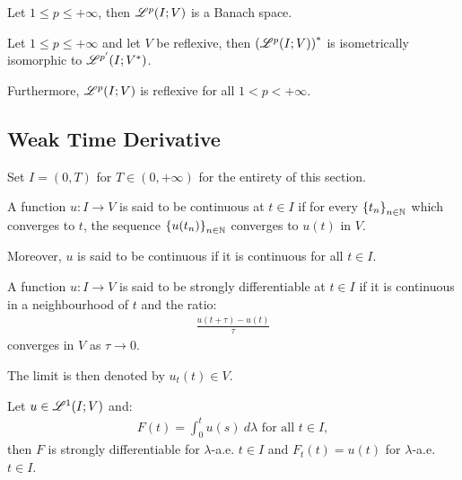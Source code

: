 \begin{theorem}
    Let $1 \leq p \leq +\infty$, then $\mathscr{L}^{p}(I; V)$ is a Banach space.
\end{theorem}

\begin{theorem} %
    Let $1 \leq p \leq +\infty$ and let $V$ be reflexive, then $\left( \mathscr{L}^{p}(I; V) \right)^*$ is isometrically isomorphic to $\mathscr{L}^{p^{\prime}}(I; V^*)$.

    Furthermore, $\mathscr{L}^{p}(I; V)$ is reflexive for all $1 < p < +\infty$.
\end{theorem}

\newpage
\subsection{Weak Time Derivative}

Set $I = (0, T)$ for $T \in (0, +\infty)$ for the entirety of this section.

\begin{definition}[Continuity]
    A function $u\colon I \rightarrow V$ is said to be continuous at $t \in I$ if for every $\left\{ t_n \right\}_{n \in \mathbb{N}}$ which converges to $t$, the sequence $\left\{ u(t_n) \right\}_{n \in \mathbb{N}}$ converges to $u(t)$ in $V$.

    Moreover, $u$ is said to be continuous if it is continuous for all $t \in I$.
\end{definition}

\begin{definition}
    A function $u\colon I \rightarrow V$ is said to be strongly differentiable at $t \in I$ if it is continuous in a neighbourhood of $t$ and the ratio:
    \begin{gather}
        \frac{u(t + \tau) - u(t)}{\tau}
    \end{gather}
    converges in $V$ as $\tau \rightarrow 0$.

    The limit is then denoted by $u_t(t) \in V$.
\end{definition}

\begin{theorem}
    Let $u \in \mathscr{L}^{1}(I; V)$ and:
    \begin{gather}
        F(t) = \int_0^t u(s) ~ d \lambda \text{ for all } t \in I,
    \end{gather}
    then $F$ is strongly differentiable for $\lambda$-a.e. $t \in I$ and $F_t(t) = u(t)$ for $\lambda$-a.e. $t \in I$.
\end{theorem}

